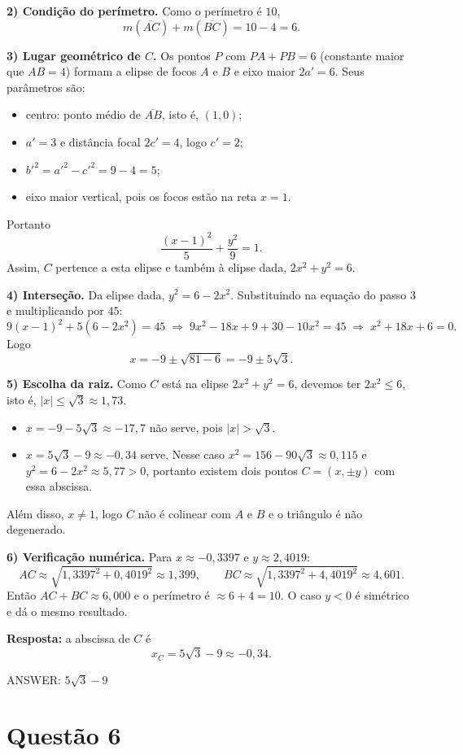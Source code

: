 \documentclass{article}%
\begin{document}
\textbf{2) Condição do perímetro.} Como o perímetro é $10$,
\[
m(\overline{AC})+m(\overline{BC})=10-4=6 .
\]

\textbf{3) Lugar geométrico de $C$.} Os pontos $P$ com $PA+PB=6$ (constante maior que $AB=4$) formam a elipse de focos $A$ e $B$ e eixo maior $2a'=6$. Seus parâmetros são:
\begin{itemize}
\item centro: ponto médio de $\overline{AB}$, isto é, $(1,0)$;
\item $a'=3$ e distância focal $2c'=4$, logo $c'=2$;
\item $b'^2=a'^2-c'^2=9-4=5$;
\item eixo maior vertical, pois os focos estão na reta $x=1$.
\end{itemize}
Portanto
\[
\frac{(x-1)^2}{5}+\frac{y^2}{9}=1 .
\]
Assim, $C$ pertence a esta elipse e também à elipse dada, $2x^2+y^2=6$.

\textbf{4) Interseção.} Da elipse dada, $y^2=6-2x^2$. Substituindo na equação do passo 3 e multiplicando por $45$:
\[
9(x-1)^2+5(6-2x^2)=45
\;\Longrightarrow\; 9x^2-18x+9+30-10x^2=45
\;\Longrightarrow\; x^2+18x+6=0 .
\]
Logo
\[
x=-9\pm\sqrt{81-6}=-9\pm 5\sqrt3 .
\]

\textbf{5) Escolha da raiz.} Como $C$ está na elipse $2x^2+y^2=6$, devemos ter $2x^2\le 6$, isto é, $|x|\le\sqrt3\approx1{,}73$.
\begin{itemize}
\item $x=-9-5\sqrt3\approx-17{,}7$ não serve, pois $|x|>\sqrt3$.
\item $x=5\sqrt3-9\approx-0{,}34$ serve. Nesse caso $x^2=156-90\sqrt3\approx0{,}115$ e $y^2=6-2x^2\approx5{,}77>0$, portanto existem dois pontos $C=(x,\pm y)$ com essa abscissa.
\end{itemize}
Além disso, $x\neq1$, logo $C$ não é colinear com $A$ e $B$ e o triângulo é não degenerado.

\textbf{6) Verificação numérica.} Para $x\approx-0{,}3397$ e $y\approx2{,}4019$:
\[
AC\approx\sqrt{1{,}3397^2+0{,}4019^2}\approx1{,}399,\qquad
BC\approx\sqrt{1{,}3397^2+4{,}4019^2}\approx4{,}601 .
\]
Então $AC+BC\approx6{,}000$ e o perímetro é $\approx 6+4=10$. O caso $y<0$ é simétrico e dá o mesmo resultado.

\textbf{Resposta:} a abscissa de $C$ é
\[
x_C=5\sqrt3-9\approx -0{,}34 .
\]

ANSWER: $5\sqrt{3}-9$
%
\newpage%
\section*{Questão 6}
\end{document}
